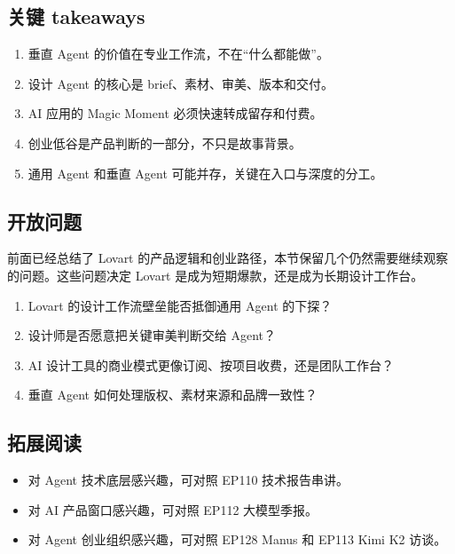 \documentclass[a4paper]{article}
\begin{document}
\subsection{关键 takeaways}

\begin{enumerate}
\item 垂直 Agent 的价值在专业工作流，不在“什么都能做”。
\item 设计 Agent 的核心是 brief、素材、审美、版本和交付。
\item AI 应用的 Magic Moment 必须快速转成留存和付费。
\item 创业低谷是产品判断的一部分，不只是故事背景。
\item 通用 Agent 和垂直 Agent 可能并存，关键在入口与深度的分工。
\end{enumerate}

\subsection{开放问题}

前面已经总结了 Lovart 的产品逻辑和创业路径，本节保留几个仍然需要继续观察的问题。这些问题决定 Lovart 是成为短期爆款，还是成为长期设计工作台。

\begin{enumerate}
\item Lovart 的设计工作流壁垒能否抵御通用 Agent 的下探？
\item 设计师是否愿意把关键审美判断交给 Agent？
\item AI 设计工具的商业模式更像订阅、按项目收费，还是团队工作台？
\item 垂直 Agent 如何处理版权、素材来源和品牌一致性？
\end{enumerate}

\subsection{拓展阅读}

\begin{itemize}
\item 对 Agent 技术底层感兴趣，可对照 EP110 技术报告串讲。
\item 对 AI 产品窗口感兴趣，可对照 EP112 大模型季报。
\item 对 Agent 创业组织感兴趣，可对照 EP128 Manus 和 EP113 Kimi K2 访谈。
\end{itemize}
\end{document}
